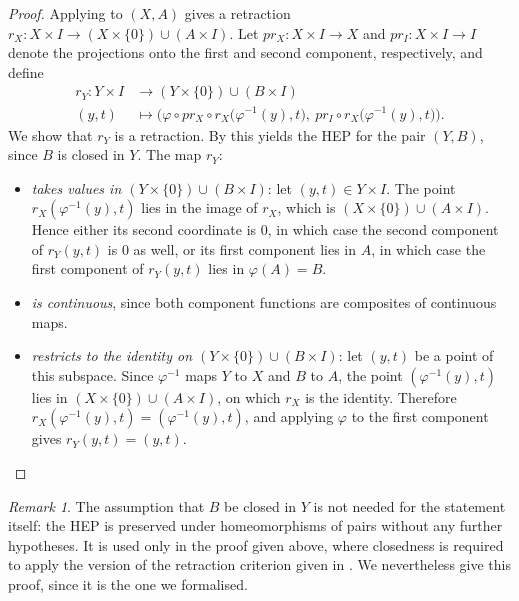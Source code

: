 \documentclass[11pt, a4paper, english]{article}
\theoremstyle{plain}
\theoremstyle{definition}
\theoremstyle{remark}
\newtheorem{remark}[theorem]{Remark}
\numberwithin{equation}{section}
\numberwithin{theorem}{section}
\begin{document}
\begin{proof}
    Applying  to $(X,A)$ gives a retraction $r_X \colon X \times I \to (X \times \{0\}) \cup (A \times I)$. Let $pr_X \colon X \times I \to X$ and $pr_I \colon X \times I \to I$ denote the projections onto the first and second component, respectively, and define 
    \begin{align*}
        r_Y \colon Y \times I &\longrightarrow (Y \times \{0\}) \cup (B \times I) \\
        (y,t) &\longmapsto
        \Big(\varphi \circ pr_X \circ r_X\big(\varphi^{-1}(y), t\big),\
        pr_I \circ r_X\big(\varphi^{-1}(y), t\big)\Big) .
    \end{align*}
    We show that $r_Y$ is a retraction. By  this  yields the HEP for the pair $(Y,B)$, since $B$ is closed in $Y$. The map $r_Y \colon$
    \begin{itemize}
    \item \emph{takes values in $(Y \times \{0\}) \cup (B \times I)$}: let $(y,t) \in Y \times I$. The point $r_X(\varphi^{-1}(y),t)$ lies in the image of $r_X$, which is $(X \times \{0\}) \cup (A \times I)$. Hence either its second coordinate is $0$, in which case the second component of $r_Y(y,t)$ is $0$ as well, or its first component lies in $A$, in which case the first component of $r_Y(y,t)$ lies in $\varphi(A) = B$.
    \item \emph{is continuous}, since both component functions are composites of continuous maps.
    \item \emph{restricts to the identity on $(Y \times \{0\}) \cup (B \times I)$}: let $(y,t)$ be a point of this subspace. Since $\varphi^{-1}$ maps $Y$ to $X$ and $B$ to $A$, the point $(\varphi^{-1}(y),t)$ lies in $(X \times \{0\}) \cup (A \times I)$, on which $r_X$ is the identity. Therefore $r_X(\varphi^{-1}(y),t) = (\varphi^{-1}(y),t)$, and applying $\varphi$ to the first component gives $r_Y(y,t) = (y,t)$. \qedhere
    \end{itemize}
\end{proof}

\begin{remark}
The assumption that $B$ be closed in $Y$ is not needed for the statement itself: the HEP is preserved under homeomorphisms of pairs without any further hypotheses. It is used only in the proof given above, where closedness is required to apply the version of the retraction criterion given in . We nevertheless give this proof, since it is the one we formalised. \end{remark}
\end{document}
